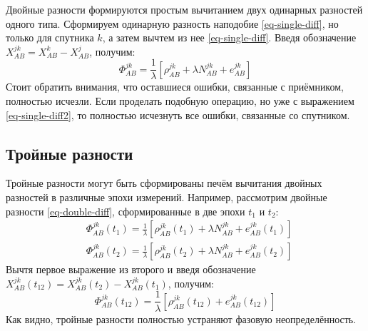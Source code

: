 Двойные разности формируются простым вычитанием двух одинарных разностей одного типа.
Сформируем одинарную разность наподобие \eqref{eq-single-diff}, но только для спутника $k$, а затем вычтем из нее \eqref{eq-single-diff}.
Введя обозначение $X_{AB}^{jk}=X_{AB}^k-X_{AB}^j$, получим:
\begin{equation}
\label{eq-double-diff}
\Phi_{AB}^{jk}=\frac{1}{\lambda}\left[\rho_{AB}^{jk}+\lambda N_{AB}^{jk}+e_{AB}^{jk}\right]    
\end{equation}
Стоит обратить внимания, что оставшиеся ошибки, связанные с приёмником, полностью исчезли.
Если проделать подобную операцию, но уже с выражением \eqref{eq-single-diff2}, то полностью исчезнуть все ошибки, связанные со спутником.

\subsection*{\textbf{Тройные разности}}

Тройные разности могут быть сформированы печём вычитания двойных разностей в различные эпохи измерений.
Например, рассмотрим двойные разности \eqref{eq-double-diff}, сформированные в две эпохи $t_1$ и $t_2$:
\begin{equation}
\begin{aligned}
&\Phi_{AB}^{jk}(t_1)=\frac{1}{\lambda}\left[\rho_{AB}^{jk}(t_1)+\lambda N_{AB}^{jk}+e_{AB}^{jk}(t_1)\right] \\
&\Phi_{AB}^{jk}(t_2)=\frac{1}{\lambda}\left[\rho_{AB}^{jk}(t_2)+\lambda N_{AB}^{jk}+e_{AB}^{jk}(t_2)\right] 
\end{aligned}
\end{equation}
Вычтя первое выражение из второго и введя обозначение $X_{AB}^{jk}(t_{12})=X_{AB}^{jk}(t_2)-X_{AB}^{jk}(t_1)$, получим:
\begin{equation}
\Phi_{AB}^{jk}(t_{12})=\frac{1}{\lambda}\left[\rho_{AB}^{jk}(t_{12})+e_{AB}^{jk}(t_{12})\right]    
\end{equation}
Как видно, тройные разности полностью устраняют фазовую неопределённость.